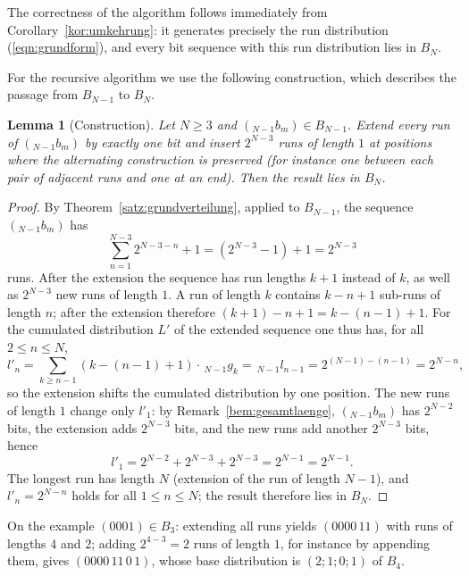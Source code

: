 \documentclass[11pt,a4paper]{scrartcl}
\theoremstyle{plain}
\newtheorem{lemma}[satz]{Lemma}
\theoremstyle{definition}
\theoremstyle{remark}
\begin{document}
\noindent The correctness of the algorithm follows immediately from
Corollary~\ref{kor:umkehrung}: it generates precisely the run
distribution (\ref{eqn:grundform}), and every bit sequence with this
run distribution lies in $B_N$.

\noindent For the recursive algorithm we use the following
construction, which describes the passage from $B_{N-1}$ to $B_N$.

\begin{lemma}[Construction]\label{lem:konstruktion}
Let $N\geq 3$ and $({}_{N-1}b_m)\in B_{N-1}$. Extend every run of
$({}_{N-1}b_m)$ by exactly one bit and insert $2^{N-3}$ runs of
length $1$ at positions where the alternating construction is
preserved (for instance one between each pair of adjacent runs and
one at an end). Then the result lies in $B_N$.
\end{lemma}

\begin{proof}
By Theorem~\ref{satz:grundverteilung}, applied to $B_{N-1}$, the
sequence $({}_{N-1}b_m)$ has
\begin{equation*}
  \sum_{n=1}^{N-3}2^{N-3-n}+1=\left(2^{N-3}-1\right)+1=2^{N-3}
\end{equation*}
runs. After the extension the sequence has run lengths $k+1$ instead
of $k$, as well as $2^{N-3}$ new runs of length $1$. A run of length
$k$ contains $k-n+1$ sub-runs of length $n$; after the extension
therefore $(k+1)-n+1=k-(n-1)+1$. For the cumulated distribution $L'$
of the extended sequence one thus has, for all $2\leq n\leq N$,
\begin{equation*}
  l'_n=\sum_{k\geq n-1}\left(k-(n-1)+1\right)\cdot\,_{N-1}g_k
  =\,_{N-1}l_{n-1}=2^{(N-1)-(n-1)}=2^{N-n},
\end{equation*}
so the extension shifts the cumulated distribution by one position.
The new runs of length $1$ change only $l'_1$: by
Remark~\ref{bem:gesamtlaenge}, $({}_{N-1}b_m)$ has $2^{N-2}$ bits,
the extension adds $2^{N-3}$ bits, and the new runs add another
$2^{N-3}$ bits, hence
\begin{equation*}
  l'_1=2^{N-2}+2^{N-3}+2^{N-3}=2^{N-1}=2^{N-1}.
\end{equation*}
The longest run has length $N$ (extension of the run of length
$N-1$), and $l'_n=2^{N-n}$ holds for all $1\leq n\leq N$; the result
therefore lies in $B_N$.
\end{proof}

\noindent On the example $(0001)\in B_3$: extending all runs yields
$(0000\,11)$ with runs of lengths $4$ and $2$; adding
$2^{4-3}=2$ runs of length $1$, for instance by appending them, gives
$(0000\,11\,0\,1)$, whose base distribution is $(2;1;0;1)$ of $B_4$.
\end{document}
